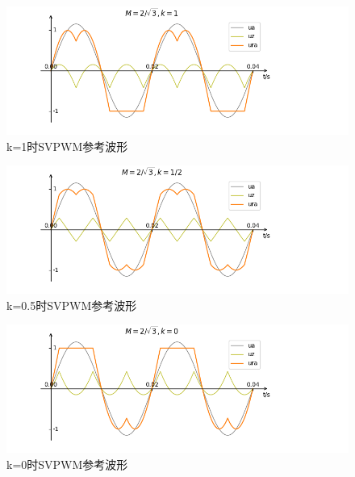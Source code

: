 \documentclass{ctexart}
\numberwithin{equation}{section}
\begin{document}
\begin{figure}[hbt]
  \centering
  \includegraphics[width = .8\linewidth ]{svpwm_modulation_wave_k1.png}
  \caption{k=1时SVPWM参考波形}
  \label{fig:svpwm-wave-k1}
\end{figure}
\begin{figure}[hbt]
  \centering
  \includegraphics[width = .8\linewidth ]{svpwm_modulation_wave_k05.png}
  \caption{k=0.5时SVPWM参考波形}
  \label{fig:svpwm-wave-k05}
\end{figure}

\begin{figure}[hbt]
  \centering
  \includegraphics[width = .8\linewidth ]{svpwm_modulation_wave_k0.png}
  \caption{k=0时SVPWM参考波形}
  \label{fig:svpwm-wave-k0}
\end{figure}
\end{document}
